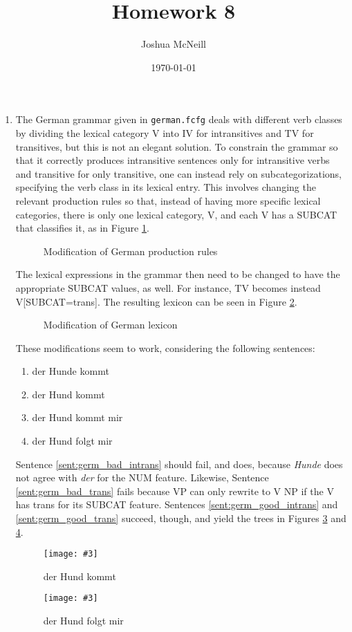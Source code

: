 \documentclass{article}
\title{Homework 8}
\author{Joshua McNeill}
\date{\today}
\newcommand{\lexi}[1]{\textit{#1}}
\newcommand{\treefig}[3]{
    \begin{figure}
      \caption{#1}
      \label{fig:#2}
      \centering
      \texttt{[image: \#3]}
    \end{figure}
  }
\begin{document}
  \maketitle
  \begin{enumerate}
    \item The German grammar given in \texttt{german.fcfg} deals with different verb classes by dividing the lexical category V into IV for intransitives and TV for transitives, but this is not an elegant solution.
    To constrain the grammar so that it correctly produces intransitive sentences only for intransitive verbs and transitive for only transitive, one can instead rely on subcategorizations, specifying the verb class in its lexical entry.
    This involves changing the relevant production rules so that, instead of having more specific lexical categories, there is only one lexical category, V, and each V has a SUBCAT that classifies it, as in Figure \ref{fig:germ_productions}.
    \begin{figure}[htbp]
      \caption{Modification of German production rules}
      \label{fig:germ_productions}
      
    \end{figure}
    The lexical expressions in the grammar then need to be changed to have the appropriate SUBCAT values, as well.
    For instance, TV becomes instead V[SUBCAT=trans].
    The resulting lexicon can be seen in Figure \ref{fig:germ_lexicon}.
    \begin{figure}[htbp]
      \caption{Modification of German lexicon}
      \label{fig:germ_lexicon}
      
    \end{figure}
    These modifications seem to work, considering the following sentences:
    \begin{enumerate}
      \item der Hunde kommt\label{sent:germ_bad_intrans}
      \item der Hund kommt\label{sent:germ_good_intrans}
      \item der Hund kommt mir\label{sent:germ_bad_trans}
      \item der Hund folgt mir\label{sent:germ_good_trans}
    \end{enumerate}
    Sentence \ref{sent:germ_bad_intrans} should fail, and does, because \lexi{Hunde} does not agree with \lexi{der} for the NUM feature.
    Likewise, Sentence \ref{sent:germ_bad_trans} fails because VP can only rewrite to V NP if the V has trans for its SUBCAT feature.
    Sentences \ref{sent:germ_good_intrans} and \ref{sent:germ_good_trans} succeed, though, and yield the trees in Figures \ref{fig:germ_tree_intrans} and \ref{fig:germ_tree_trans}.
    \treefig{der Hund kommt}{germ_tree_intrans}{derHundkommt.ps}
    \treefig{der Hund folgt mir}{germ_tree_trans}{derHundfolgtmir.ps}
  \end{enumerate}
\end{document}
